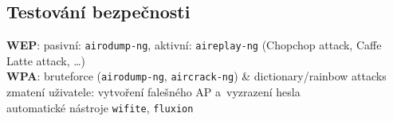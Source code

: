 \subsection{Testování bezpečnosti}

\textbf{WEP}: pasivní: \texttt{airodump-ng}, aktivní: \texttt{aireplay-ng} (Chopchop attack, Caffe Latte attack, \dots) \\
\textbf{WPA}: bruteforce (\texttt{airodump-ng}, \texttt{aircrack-ng}) \& dictionary/rainbow attacks \\
zmatení uživatele: vytvoření falešného AP a~vyzrazení hesla \\
automatické nástroje \texttt{wifite}, \texttt{fluxion}
